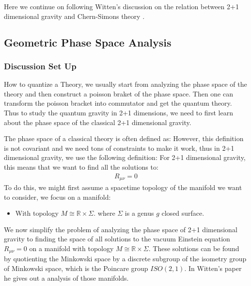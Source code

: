 Here we continue on following Witten's discussion on the relation
between 2+1 dimensional gravity and Chern-Simons theory
\cite{witten21Dimensional1988}.
\subsection{Geometric Phase Space Analysis}

\subsubsection{Discussion Set Up}

How to quantize a Theory, we usually start from analyzing the phase
space of the theory and then construct a poisson braket of the phase
space. Then one can transform the poisson bracket into commutator and
get the quantum theory.
Thus to study the quantum gravity in 2+1 dimensions, we need to first
learn about the phase space of the classical 2+1 dimensional gravity.

The phase space of a classical theory is often defined as:
However, this definition is not covariant and we need tons of
constraints to make it work, thus in 2+1 dimensional gravity, we use
the following definition:
For 2+1 dimensional gravity, this means that we want to find all the
solutions to:
\begin{align}
  R_{\mu\nu} = 0
\end{align}
To do this, we might first assume a spacetime topology of the
manifold we want to consider, we focus on a manifold:
\begin{itemize}
  \item With topology $ M \cong \mathbb{R} \times \Sigma $. where $ \Sigma
    $ is a genus $ g $ closed surface.
\end{itemize}

We now simplify the problem of analyzing the phase space of 2+1
dimensional gravity to finding the space of all solutions to the
vacuum Einstein equation $ R_{\mu\nu} = 0 $ on a manifold with
topology $ M \cong \mathbb{R} \times \Sigma $. These solutions can be
found by quotienting the Minkowski space by a discrete subgroup of
the isometry group of Minkowski space, which is the Poincare group $
ISO(2,1) $. In Witten's paper he gives out a analysis of those manifolds.

